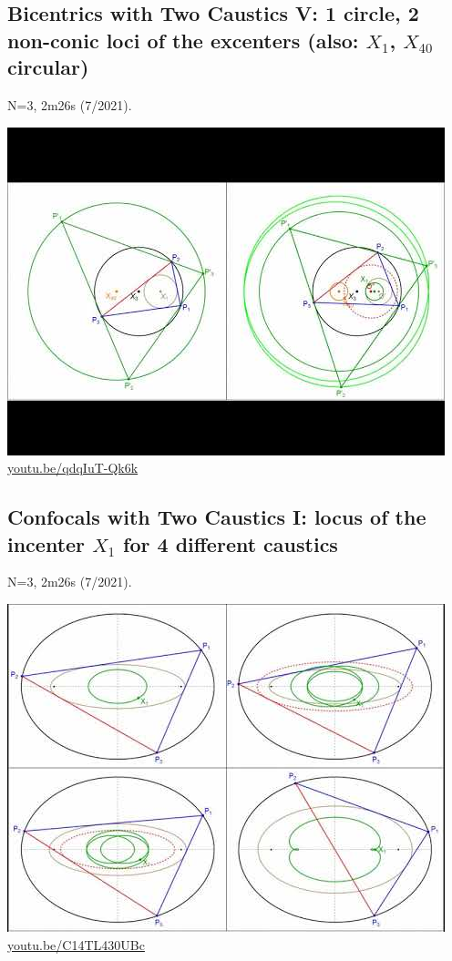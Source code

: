 \documentclass[12pt]{amsart}
\begin{document}
\subsection{Bicentrics with Two Caustics V: 1 circle, 2 non-conic loci of the excenters (also: $X_{1}$, $X_{40}$ circular)}
\label{vid:qdqIuT-Qk6k}
\noindent N=3, 2m26s (7/2021). 
\begin{center}\includegraphics[width=.5\textwidth]{pics/qdqIuT-Qk6k.jpg} \\ 
\href{https://youtu.be/qdqIuT-Qk6k}{\url{youtu.be/qdqIuT-Qk6k}}\end{center}
% 
\subsection{Confocals with Two Caustics I: locus of the incenter $X_{1}$ for 4 different caustics}
\label{vid:C14TL430UBc}
\noindent N=3, 2m26s (7/2021). 
\begin{center}\includegraphics[width=.5\textwidth]{pics/C14TL430UBc.jpg} \\ 
\href{https://youtu.be/C14TL430UBc}{\url{youtu.be/C14TL430UBc}}\end{center}
% 
\end{document}

